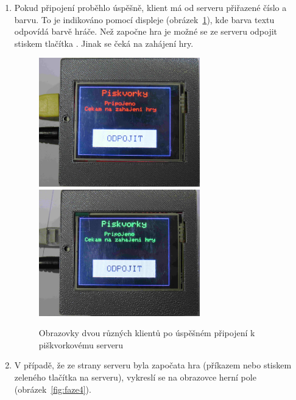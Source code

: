 \begin{enumerate}
\item Pokud připojení proběhlo úspěšně, klient má od serveru přiřazené číslo a barvu. To je indikováno pomocí displeje (obrázek~\ref{fig:faze3}), kde barva textu odpovídá barvě hráče. Než započne hra je možné se ze serveru odpojit stiskem tlačítka . Jinak se čeká na zahájení hry.
\begin{figure}[H]
\centering
\includegraphics[width=7cm, angle=0]{img/gameFlow/phase03a.jpg}
\includegraphics[width=7cm, angle=0]{img/gameFlow/phase03b.jpg}
\caption{\label{fig:faze3} Obrazovky dvou různých klientů  po úspěšném připojení k piškvorkovému serveru}
\end{figure}
\label{item:faze3}

\item V případě, že ze strany serveru byla započata hra (příkazem nebo stiskem zeleného tlačítka na serveru), vykreslí se na obrazovce herní pole (obrázek~\ref{fig:faze4}).


\end{enumerate}
